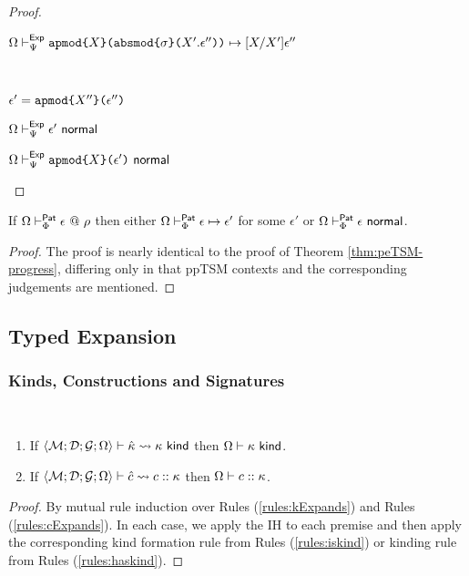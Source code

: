 \begin{proof}
\begin{byCases}
\begin{byCases}
\begin{byCases}
\begin{pfsteps*}
              \item $\Omega \vdash_{\Psi}^\mathsf{Exp} \texttt{apmod}\texttt{\{}X\texttt{\}(}\texttt{absmod}\texttt{\{}\sigma\texttt{\}(}X'.\epsilon''\texttt{)}\texttt{)} \mapsto [X/X']\epsilon''$ 
            \end{pfsteps*}
          \item[\text{(\ref{rule:tsmexpNormalExp-apmod})}] ~
            \begin{pfsteps*}
              \item $\epsilon' = \texttt{apmod}\texttt{\{}X''\texttt{\}(}\epsilon''\texttt{)}$ 
              \item $\Omega \vdash_{\Psi}^\mathsf{Exp} \epsilon'~\mathsf{normal}$                
              \item $\Omega \vdash_{\Psi}^\mathsf{Exp} \texttt{apmod}\texttt{\{}X\texttt{\}(}\epsilon'\texttt{)}~\mathsf{normal}$ 
            \end{pfsteps*}
        \end{byCases}
    \end{byCases}
    \resetpfcounter
\end{byCases}
\end{proof}

\begin{theorem}
\label{thm:ppTSM-progress}
If $\Omega \vdash_{\Phi}^{\mathsf{Pat}} \epsilon ~@~ \rho$ then either $\Omega \vdash_{\Phi}^\mathsf{Pat} \epsilon \mapsto \epsilon'$ for some $\epsilon'$ or $\Omega \vdash_{\Phi}^\mathsf{Pat} \epsilon~\mathsf{normal}$.
\end{theorem}
\begin{proof} The proof is nearly identical to the proof of Theorem \ref{thm:peTSM-progress}, differing only in that ppTSM contexts and the corresponding judgements are mentioned. \end{proof}

\subsection{Typed Expansion}
\subsubsection{Kinds, Constructions and Signatures}
\begin{theorem}
\label{thm:kind-and-constructor-expansion-P}
~
\begin{enumerate}
\item If $\langle \mathcal{M}; \mathcal{D}; \mathcal{G}; \Omega \rangle \vdash {\hat\kappa} \leadsto \kappa~\mathsf{kind}$ then $\Omega \vdash \kappa~\mathsf{kind}$.
\item If $\langle \mathcal{M}; \mathcal{D}; \mathcal{G}; \Omega \rangle \vdash {\hat c} \leadsto c :: \kappa$ then $\Omega \vdash c :: \kappa$.
\end{enumerate}
\end{theorem}
\begin{proof}
By mutual rule induction over Rules (\ref{rules:kExpands}) and Rules (\ref{rules:cExpands}). In each case, we apply the IH to each premise and then apply the corresponding kind formation rule from Rules (\ref{rules:iskind}) or kinding rule from Rules (\ref{rules:haskind}).
\end{proof}

